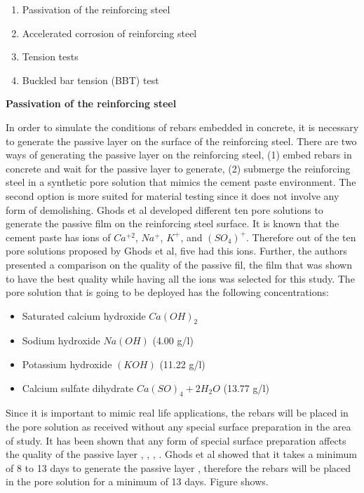\begin{enumerate}
	\item Passivation of the reinforcing steel
	\item Accelerated corrosion  of reinforcing steel
	\item Tension tests
	\item Buckled bar tension (BBT) test
\end{enumerate}

\textbf{Passivation of the reinforcing steel}

In order to simulate the conditions of rebars embedded in concrete, it is necessary to generate the passive layer on the surface of the reinforcing steel. There are two ways of generating the passive layer on the reinforcing steel, (1) embed rebars in concrete and wait for the passive layer to generate, (2) submerge the reinforcing steel in a synthetic pore solution that mimics the cement paste environment. The second option is more suited for material testing since it does not involve any form of demolishing. Ghods et al \cite{Ghods2010} developed different ten pore solutions to generate the passive film on the reinforcing steel surface. It is known that the cement paste has ions of $Ca^{+2}$, $Na^{+}$, $K^{+}$, and $(SO_{4})^{+}$. Therefore out of the ten pore solutions proposed by Ghods et al, five had this ions. Further, the authors presented a comparison on the quality of the passive fil, the film that was shown to have the best quality while having all the ions was selected for this study. The pore solution that is going to be deployed has the following concentrations:

\begin{itemize}
	\item Saturated calcium hydroxide $Ca(OH)_2$
	\item Sodium hydroxide $Na(OH)$ (4.00 g/l)
	\item Potassium hydroxide $(KOH)$ (11.22 g/l)
	\item Calcium sulfate dihydrate $Ca(SO)_4 + 2H_2O$ (13.77 g/l)
\end{itemize}

Since it is important to mimic real life applications, the rebars will be placed in the pore solution as received without any special surface preparation in the area of study. It has been shown that any form of special surface preparation affects the quality of the passive layer \cite{Andersson1989}, \cite{DawnMarcotte2001}, \cite{Moragues1987}, \cite{Page1983}. Ghods et al showed that it takes a minimum of 8 to 13 days to generate the passive layer \cite{Ghods2009}, therefore the rebars will be placed in the pore solution for a minimum of 13 days. Figure  shows. 

